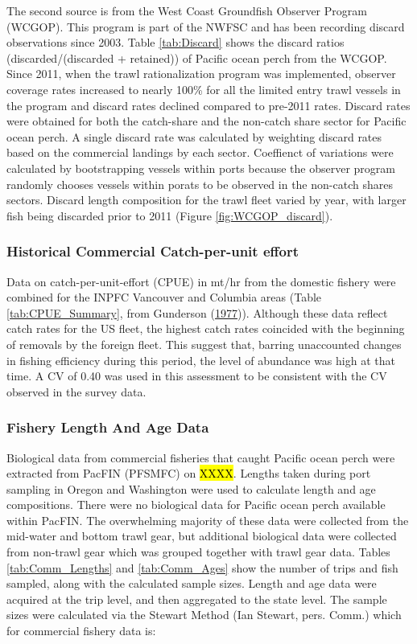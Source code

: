 \documentclass[12pt,]{article}
\begin{document}
The second source is from the West Coast Groundfish Observer Program
(WCGOP). This program is part of the NWFSC and has been recording
discard observations since 2003. Table \ref{tab:Discard} shows the
discard ratios (discarded/(discarded + retained)) of Pacific ocean perch
from the WCGOP. Since 2011, when the trawl rationalization program was
implemented, observer coverage rates increased to nearly 100\% for all
the limited entry trawl vessels in the program and discard rates
declined compared to pre-2011 rates. Discard rates were obtained for
both the catch-share and the non-catch share sector for Pacific ocean
perch. A single discard rate was calculated by weighting discard rates
based on the commercial landings by each sector. Coeffienct of
variations were calculated by bootstrapping vessels within ports because
the observer program randomly chooses vessels within porats to be
observed in the non-catch shares sectors. Discard length composition for
the trawl fleet varied by year, with larger fish being discarded prior
to 2011 (Figure \ref{fig:WCGOP_discard}).

\subsubsection{Historical Commercial Catch-per-unit
effort}\label{historical-commercial-catch-per-unit-effort}

Data on catch-per-unit-effort (CPUE) in mt/hr from the domestic fishery
were combined for the INPFC Vancouver and Columbia areas (Table
\ref{tab:CPUE_Summary}, from Gunderson
(\protect\hyperlink{ref-gunderson_population_1977}{1977})). Although
these data reflect catch rates for the US fleet, the highest catch rates
coincided with the beginning of removals by the foreign fleet. This
suggest that, barring unaccounted changes in fishing efficiency during
this period, the level of abundance was high at that time. A CV of 0.40
was used in this assessment to be consistent with the CV observed in the
survey data.

\subsubsection{Fishery Length And Age
Data}\label{fishery-length-and-age-data}

Biological data from commercial fisheries that caught Pacific ocean
perch were extracted from PacFIN (PFSMFC) on \hl{XXXX}. Lengths taken
during port sampling in Oregon and Washington were used to calculate
length and age compositions. There were no biological data for Pacific
ocean perch available within PacFIN. The overwhelming majority of these
data were collected from the mid-water and bottom trawl gear, but
additional biological data were collected from non-trawl gear which was
grouped together with trawl gear data. Tables \ref{tab:Comm_Lengths} and
\ref{tab:Comm_Ages} show the number of trips and fish sampled, along
with the calculated sample sizes. Length and age data were acquired at
the trip level, and then aggregated to the state level. The sample sizes
were calculated via the Stewart Method (Ian Stewart, pers. Comm.) which
for commercial fishery data is:
\end{document}
